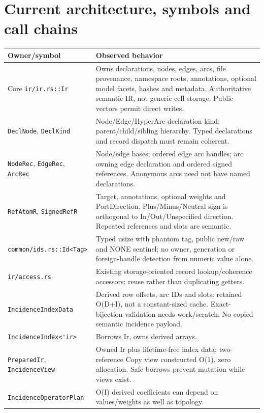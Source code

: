 \documentclass[10pt,a4paper]{article}
\newcommand{\code}[1]{{\small\nolinkurl{#1}}}
\begin{document}
\section{Current architecture, symbols and call chains}
\label{sec:architecture}
\begin{center}\end{center}
\begin{longtable}{L{37mm}L{129mm}}
\toprule Owner/symbol & Observed behavior\\\midrule
Core \code{ir/ir.rs::Ir} & Owns declarations, nodes, edges, arcs, file provenance, namespace roots, annotations, optional model facets, hashes and metadata. Authoritative semantic IR, not generic cell storage. Public vectors permit direct writes.\\
\code{DeclNode}, \code{DeclKind} & Node/Edge/HyperArc declaration kind; parent/child/sibling hierarchy. Typed declarations and record dispatch must remain coherent.\\
\code{NodeRec}, \code{EdgeRec}, \code{ArcRec} & Node/edge bases; ordered edge arc handles; arc owning edge declaration and ordered signed references. Anonymous arcs need not have named declarations.\\
\code{RefAtomR}, \code{SignedRefR} & Target, annotations, optional weights and PortDirection. Plus/Minus/Neutral sign is orthogonal to In/Out/Unspecified direction. Repeated references and slots are semantic.\\
\code{common/ids.rs::Id<Tag>} & Typed usize with phantom tag, public new/raw and NONE sentinel; no owner, generation or foreign-handle detection from numeric value alone.\\
\code{ir/access.rs} & Existing storage-oriented record lookup/coherence accessors; reuse rather than duplicating getters.\\
\code{IncidenceIndexData} & Derived row offsets, arc IDs and slots: retained O(D+I), not a constant-sized cache. Exact-bijection validation needs work/scratch. No copied semantic incidence payload.\\
\code{IncidenceIndex<'ir>} & Borrows Ir, owns derived arrays.\\
\code{PreparedIr}, \code{IncidenceView} & Owned Ir plus lifetime-free index data; two-reference Copy view constructed O(1), zero allocation. Safe borrows prevent mutation while views exist.\\
\code{IncidenceOperatorPlan} & O(I) derived coefficients can depend on values/weights as well as topology.\\

\end{longtable}
\end{document}
